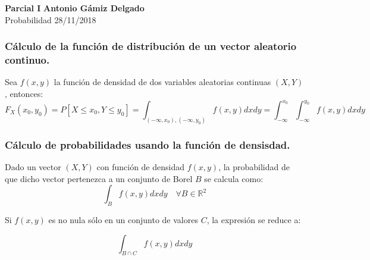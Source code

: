 \documentclass[a4paper, 11pt]{article}
\newcommand{\R}[1][]{\mathbb{R}^{#1}}
\begin{document}
\noindent
\large\textbf{Parcial I} \hfill \textbf{Antonio Gámiz Delgado} \\
\normalsize Probabilidad \hfill 28/11/2018

\subsubsection*{Cálculo de la función de distribución de un vector aleatorio continuo.}

Sea $f(x,y)$ la función de densidad de dos variables aleatorias continuas $(X,Y)$, entonces:
\[
F_X(x_0,y_0)=P[X\leq x_0, Y\leq y_0] = \int_{(-\infty, x_0),(-\infty,y_0)}f(x,y)dxdy=\int_{-\infty}^{x_0}\int_{-\infty}^{y_0}f(x,y)dxdy
\]

\subsubsection*{Cálculo de probabilidades usando la función de densisdad.}

Dado un vector $(X,Y)$ con función de densidad $f(x,y)$, la probabilidad de que dicho vector pertenezca a un conjunto de Borel $B$ se calcula como:
\[
\int_Bf(x,y)dxdy \quad \forall B \in \R[2]
\]

Si $f(x,y)$ es no nula sólo en un conjunto de valores $C$, la expresión se reduce a:

\[
\int_{B\cap C}f(x,y)dxdy
\]
\end{document}
